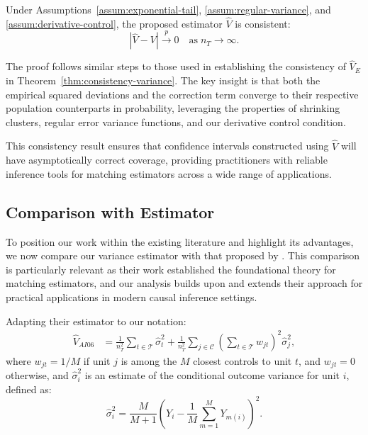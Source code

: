 \documentclass{mytemplate}
\begin{document}
\begin{theorem}
\label{thm:consistency-total-variance}
Under Assumptions~\ref{assum:exponential-tail}, \ref{assum:regular-variance}, and \ref{assum:derivative-control}, the proposed estimator $\hat{V}$ is consistent:
\[
\left|\hat{V} - V\right| \xrightarrow{p} 0 \quad \text{as} \; n_T \rightarrow \infty.
\]
\end{theorem}

The proof follows similar steps to those used in establishing the consistency of $\hat{V}_E$ in Theorem~\ref{thm:consistency-variance}. The key insight is that both the empirical squared deviations and the correction term converge to their respective population counterparts in probability, leveraging the properties of shrinking clusters, regular error variance functions, and our derivative control condition.

This consistency result ensures that confidence intervals constructed using $\hat{V}$ will have asymptotically correct coverage, providing practitioners with reliable inference tools for matching estimators across a wide range of applications.

\subsection{Comparison with \cite{abadie2006large} Estimator}
\label{sec:comparison}

To position our work within the existing literature and highlight its advantages, we now compare our variance estimator with that proposed by \cite{abadie2006large}. This comparison is particularly relevant as their work established the foundational theory for matching estimators, and our analysis builds upon and extends their approach for practical applications in modern causal inference settings.

Adapting their estimator to our notation:
\begin{align}
\label{eq:AI06-plug-in-variance-estimator}
   \widehat{V}_{AI06} &=
        \frac{1}{n_T^2} \sum_{t \in \mathcal{T}} \hat \sigma_t^2 +
        \frac{1}{n_T^2} \sum_{j \in \mathcal{C}} \left(\sum_{t \in \mathcal{T}} w_{jt}\right)^2 \hat \sigma_j^2,
\end{align}
where $w_{jt} = 1/M$ if unit $j$ is among the $M$ closest controls to unit $t$, and $w_{jt} = 0$ otherwise, and $\hat \sigma_i^2$ is an estimate of the conditional outcome variance for unit $i$, defined as:
\[
\hat\sigma_i^2 = \frac{M}{M+1} \left(Y_i - \frac{1}{M} \sum_{m=1}^{M} Y_{m(i)}\right)^2.
\]
\end{document}
